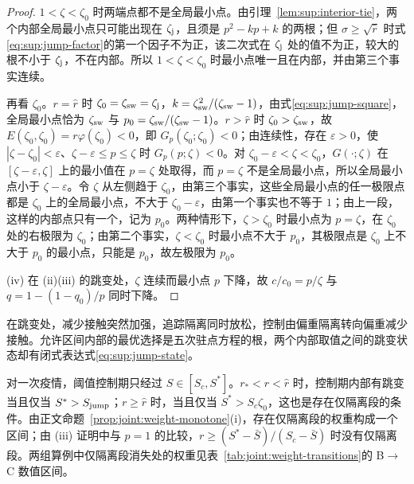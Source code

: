 \begin{proof}
$1<\zeta<\zeta_0$ 时两端点都不是全局最小点。由引理~\ref{lem:sup:interior-tie}，两个内部全局最小点只可能出现在 $\zeta_{\rm j}$，且须是 $p^2-kp+k$ 的两根；但 $\sigma\ge\sqrt{\hat r}$ 时式\eqref{eq:sup:jump-factor}的第一个因子不为正，该二次式在 $\zeta_{\rm j}$ 处的值不为正，较大的根不小于 $\zeta_{\rm j}$，不在内部。所以 $1<\zeta<\zeta_0$ 时最小点唯一且在内部，并由第三个事实连续。

再看 $\zeta_0$。$r=\hat r$ 时 $\zeta_0=\zeta_{\rm sw}=\zeta_{\rm j}$，$k=\zeta_{\rm sw}^2/(\zeta_{\rm sw}-1)$，由式\eqref{eq:sup:jump-square}，全局最小点恰为 $\zeta_{\rm sw}$ 与 $p_0=\zeta_{\rm sw}/(\zeta_{\rm sw}-1)$。$r>\hat r$ 时 $\zeta_0>\zeta_{\rm sw}$，故 $E(\zeta_0,\zeta_0)=r\varphi(\zeta_0)<0$，即 $G_p(\zeta_0;\zeta_0)<0$；由连续性，存在 $\varepsilon>0$，使 $|\zeta-\zeta_0|<\varepsilon$、$\zeta-\varepsilon\le p\le\zeta$ 时 $G_p(p;\zeta)<0$。对 $\zeta_0-\varepsilon<\zeta<\zeta_0$，$G(\cdot;\zeta)$ 在 $[\zeta-\varepsilon,\zeta]$ 上的最小值在 $p=\zeta$ 处取得，而 $p=\zeta$ 不是全局最小点，所以全局最小点小于 $\zeta-\varepsilon$。令 $\zeta$ 从左侧趋于 $\zeta_0$，由第三个事实，这些全局最小点的任一极限点都是 $\zeta_0$ 上的全局最小点，不大于 $\zeta_0-\varepsilon$，由第一个事实也不等于 $1$；由上一段，这样的内部点只有一个，记为 $p_0$。两种情形下，$\zeta>\zeta_0$ 时最小点为 $p=\zeta$，在 $\zeta_0$ 处的右极限为 $\zeta_0$；由第二个事实，$\zeta<\zeta_0$ 时最小点不大于 $p_0$，其极限点是 $\zeta_0$ 上不大于 $p_0$ 的最小点，只能是 $p_0$，故左极限为 $p_0$。

(iv) 在 (ii)(iii) 的跳变处，$\zeta$ 连续而最小点 $p$ 下降，故 $c/c_0=p/\zeta$ 与 $q=1-(1-q_0)/p$ 同时下降。
\end{proof}
在跳变处，减少接触突然加强，追踪隔离同时放松，控制由偏重隔离转向偏重减少接触。允许区间内部的最优选择是五次驻点方程的根，两个内部取值之间的跳变状态却有闭式表达式\eqref{eq:sup:jump-state}。

对一次疫情，阈值控制期只经过 $S\in[S_c,S^*]$。$r_*<r<\hat r$ 时，控制期内部有跳变当且仅当 $S^*>S_{\rm jump}$；$r\ge\hat r$ 时，当且仅当 $S^*>S_c\zeta_0$，这也是存在仅隔离段的条件。由正文命题~\ref{prop:joint:weight-monotone}(i)，存在仅隔离段的权重构成一个区间；由 (iii) 证明中与 $p=1$ 的比较，$r\ge(S^*-\bar S)/(S_c-\bar S)$ 时没有仅隔离段。两组算例中仅隔离段消失处的权重见表~\ref{tab:joint:weight-transitions}的 B$\to$C 数值区间。

